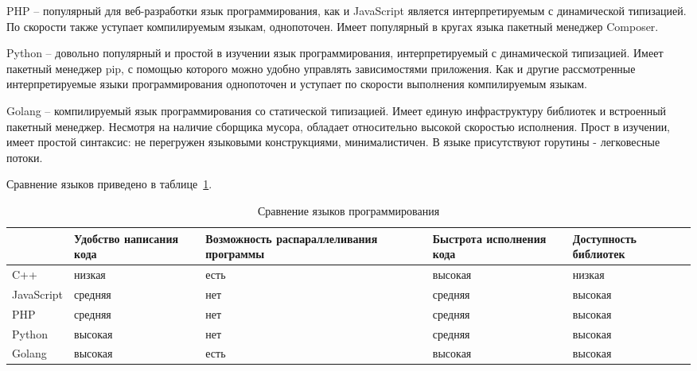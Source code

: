 PHP – популярный для веб-разработки язык программирования, как и
JavaScript является интерпретируемым с динамической типизацией. По
скорости также уступает компилируемым языкам, однопоточен. Имеет
популярный в кругах языка пакетный менеджер Composer.

Python – довольно популярный и простой в изучении язык
программирования, интерпретируемый с динамической типизацией. Имеет
пакетный менеджер pip, с помощью которого можно удобно управлять
зависимостями приложения. Как и другие рассмотренные интерпретируемые
языки программирования однопоточен и уступает по скорости выполнения
компилируемым языкам.

Golang – компилируемый язык программирования со статической
типизацией. Имеет единую инфраструктуру библиотек и встроенный
пакетный менеджер. Несмотря на наличие сборщика мусора, обладает
относительно высокой скоростью исполнения. Прост в изучении, имеет
простой синтаксис: не перегружен языковыми конструкциями,
минималистичен. В языке присутствуют горутины - легковесные потоки.

Сравнение языков приведено в таблице~\ref{t:comp-lang}.

\begin{table}[ht]
	\Large
	\caption{Сравнение языков программирования}
	\label{t:comp-lang}
	\centering
	\begin{tabularx}{\textwidth}
		{|>{}X
		|>{\centering\arraybackslash}X
		|>{\centering\arraybackslash}X
		|>{\centering\arraybackslash}X
		|>{\centering\arraybackslash}X|}
		\hline
		                                        &
		Удобство написания кода                 &
		Возможность распараллеливания программы &
		Быстрота исполнения кода                &
		Доступность библиотек                                                        \\
		\hline
		C++
		                                        & низкая  & есть & высокая & низкая  \\
		\hline
		JavaScript
		                                        & средняя & нет  & средняя & высокая \\
		\hline
		PHP
		                                        & средняя & нет  & средняя & высокая \\
		\hline
		Python
		                                        & высокая & нет  & средняя & высокая \\
		\hline
		Golang
		                                        & высокая & есть & высокая & высокая \\
		\hline
	\end{tabularx}
	\vspace{\bottompaddingoftable}
\end{table}


